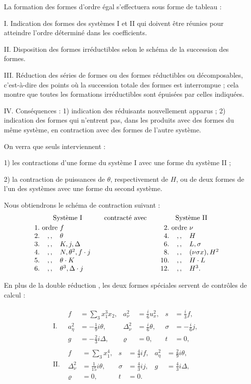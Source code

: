 \documentclass[11pt]{article}
\newcommand{\A}{\Delta}
\begin{document}
La formation des formes d'ordre égal s'effectuera sous forme de tableau :

I. Indication des formes des systèmes I et II qui doivent être réunies pour atteindre l'ordre déterminé dans les coefficients.

II. Disposition des formes irréductibles selon le schéma de la succession des formes.

III. Réduction des séries de formes ou des formes réductibles ou décomposables, c'est-à-dire des points où la succession totale des formes est interrompue ; cela montre que toutes les formations irréductibles sont épuisées par celles indiquées.

IV. Conséquences : 1) indication des réduisants nouvellement apparus ; 2) indication des formes qui n'entrent pas, dans les produits avec des formes du même système, en contraction avec des formes de l'autre système.

On verra que seuls interviennent :

1) les contractions d'une forme du système I avec une forme du système II ;

2) la contraction de puissances de $\theta$, respectivement de $H$, ou de deux formes de l'un des systèmes avec une forme du second système.

Nous obtiendrons le schéma de contraction suivant :
\[
\begin{array}{r@{\ }c@{\ }l@{\qquad}c@{\qquad}r@{\ }c@{\ }l}
\multicolumn{3}{c}{\text{Système I}} & \text{contracté avec} & \multicolumn{3}{c}{\text{Système II}}\\[0.25em]
1. & \text{ordre} & f & & 2. & \text{ordre} & \nu\\
2. & ,, & \theta & & 4. & ,, & H\\
3. & ,, & K,j,\A & & 6. & ,, & L,\sigma\\
4. & ,, & N,\theta^2,f\cdot j & & 8. & ,, & (\nu\sigma x),H^2\\
5. & ,, & \theta\cdot K & & 10. & ,, & H\cdot L\\
6. & ,, & \theta^3,\A\cdot j & & 12. & ,, & H^3.
\end{array}
\]

En plus de la \og{} double réduction \fg{}, les deux formes spéciales servent de contrôles de calcul :

\[
\begin{array}{ll}
\text{I.}&\begin{array}{rlrlrl}
f&=\displaystyle\sum_3x_1^3x_2,& a_\nu^2&=\frac{i}{6}u_x^2,& s&=\frac{i}{3}f,\\
a_\eta^2&=-\frac19 i\theta,& \A_\nu^2&=\frac{i}{6}\theta,& \sigma&=-\frac{i}{6}j,\\
g&=-\frac23i\Delta,& \varrho&=0,& t&=0,
\end{array}\\[1.2em]
\text{II.}&\begin{array}{rlrlrl}
f&=\displaystyle\sum_3x_1^4,& s&=\frac43if,& a_\eta^2&=\frac29i\theta,\\
\Delta_\nu^2&=\frac1{15}i\theta,& \sigma&=\frac43ij,& g&=\frac43i\Delta,\\
\varrho&=0,& t&=0.
\end{array}
\end{array}
\]
\end{document}
